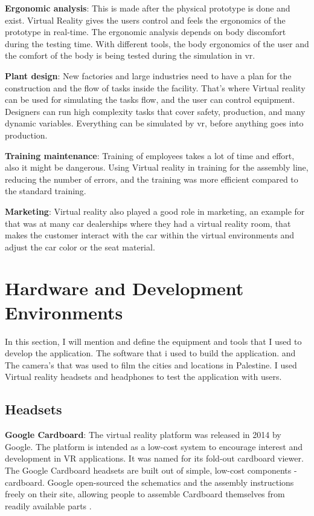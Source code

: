 \textbf{Ergonomic analysis}: This is made after the physical prototype is done and exist. Virtual Reality gives the users control and feels the ergonomics of the prototype in real-time. The ergonomic analysis depends on body discomfort during the testing time. With different tools, the body ergonomics of the user and the comfort of the body is being tested during the simulation in \acrshort{vr}. 

\textbf{Plant design}: New factories and large industries need to have a plan for the construction and the flow of tasks inside the facility. That's where Virtual reality can be used for simulating the tasks flow, and the user can control equipment. Designers can run high complexity tasks that cover safety, production, and many dynamic variables. Everything can be simulated by \acrshort{vr}, before anything goes into production.  

\textbf{Training maintenance}:  Training of employees takes a lot of time and effort, also it might be dangerous. Using Virtual reality in training for the assembly line, reducing the number of errors, and the training was more efficient compared to the standard training.

\textbf{Marketing}: Virtual reality also played a good role in marketing, an example for that was at many car dealerships where they had a virtual reality room, that makes the customer interact with the car within the virtual environments and adjust the car color or the seat material.

\section{Hardware and Development Environments}

In this section, I will mention and define the equipment and tools that I used to develop the application. The software that i used to build the application. and The camera's that was used to film the cities and locations in Palestine. I used Virtual reality headsets and headphones to test the application with users.


\subsection{Headsets}

\textbf{Google Cardboard}: The virtual reality platform was released in
2014 by Google. The platform is intended as a low-cost system to
encourage interest and development in VR applications. It was
named for its fold-out cardboard viewer. The Google Cardboard
headsets are built out of simple, low-cost components -
cardboard. Google open-sourced the schematics and the
assembly instructions freely on their site, allowing people to
assemble Cardboard themselves from readily available parts \citep{Prasuethsut2014GoogleReview}.


